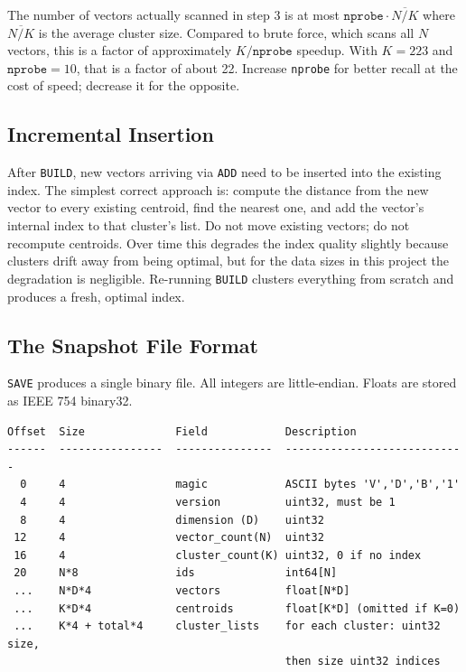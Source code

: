 \documentclass[11pt,a4paper]{article}
\begin{document}
The number of vectors actually scanned in step 3 is at most $\texttt{nprobe} \cdot \overline{N/K}$ where $\overline{N/K}$ is the average cluster size. Compared to brute force, which scans all $N$ vectors, this is a factor of approximately $K / \texttt{nprobe}$ speedup. With $K = 223$ and $\texttt{nprobe} = 10$, that is a factor of about 22. Increase \texttt{nprobe} for better recall at the cost of speed; decrease it for the opposite.

\subsection{Incremental Insertion}
After \texttt{BUILD}, new vectors arriving via \texttt{ADD} need to be inserted into the existing index. The simplest correct approach is: compute the distance from the new vector to every existing centroid, find the nearest one, and add the vector's internal index to that cluster's list. Do not move existing vectors; do not recompute centroids. Over time this degrades the index quality slightly because clusters drift away from being optimal, but for the data sizes in this project the degradation is negligible. Re-running \texttt{BUILD} clusters everything from scratch and produces a fresh, optimal index.

\subsection{The Snapshot File Format}
\texttt{SAVE} produces a single binary file. All integers are little-endian. Floats are stored as IEEE 754 binary32.

\begin{codebox}
\begin{lstlisting}
Offset  Size              Field            Description
------  ----------------  ---------------  ----------------------------
  0     4                 magic            ASCII bytes 'V','D','B','1'
  4     4                 version          uint32, must be 1
  8     4                 dimension (D)    uint32
 12     4                 vector_count(N)  uint32
 16     4                 cluster_count(K) uint32, 0 if no index
 20     N*8               ids              int64[N]
 ...    N*D*4             vectors          float[N*D]
 ...    K*D*4             centroids        float[K*D] (omitted if K=0)
 ...    K*4 + total*4     cluster_lists    for each cluster: uint32 size,
                                           then size uint32 indices
\end{lstlisting}
\end{codebox}
\end{document}

